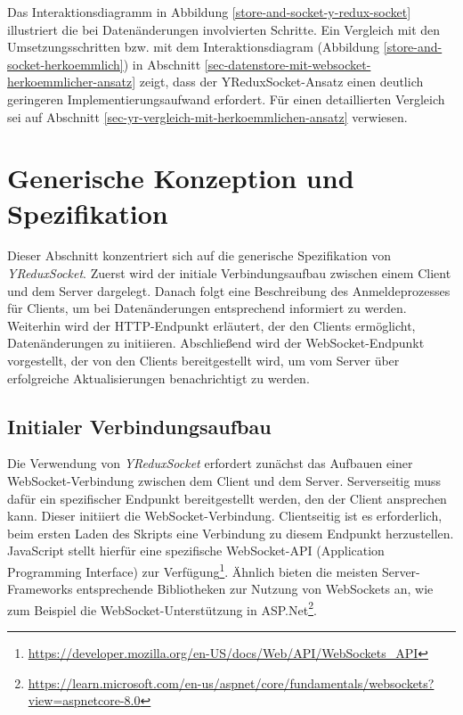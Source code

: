 \documentclass[12pt]{book}          %
\begin{document}
Das Interaktionsdiagramm in Abbildung \ref{store-and-socket-y-redux-socket} illustriert die bei Datenänderungen involvierten Schritte. Ein Vergleich mit den Umsetzungsschritten bzw. mit dem Interaktionsdiagram (Abbildung \ref{store-and-socket-herkoemmlich}) in Abschnitt \ref{sec-datenstore-mit-websocket-herkoemmlicher-ansatz} zeigt, dass der YReduxSocket-Ansatz einen deutlich geringeren Implementierungsaufwand erfordert. Für einen detaillierten Vergleich sei auf Abschnitt \ref{sec-yr-vergleich-mit-herkoemmlichen-ansatz} verwiesen.

\section{Generische Konzeption und Spezifikation}
\label{sec-generische-konzeption-und-spezifikation}

Dieser Abschnitt konzentriert sich auf die generische Spezifikation von \textit{YReduxSocket}. Zuerst wird der initiale Verbindungsaufbau zwischen einem Client und dem Server dargelegt. Danach folgt eine Beschreibung des Anmeldeprozesses für Clients, um bei Datenänderungen entsprechend informiert zu werden. Weiterhin wird der HTTP-Endpunkt erläutert, der den Clients ermöglicht, Datenänderungen zu initiieren. Abschließend wird der WebSocket-Endpunkt vorgestellt, der von den Clients bereitgestellt wird, um vom Server über erfolgreiche Aktualisierungen benachrichtigt zu werden.

\subsection{Initialer Verbindungsaufbau}
\label{subsec-initialer-verbindungsaufbau}

Die Verwendung von \textit{YReduxSocket} erfordert zunächst das Aufbauen einer WebSocket-Verbindung zwischen dem Client und dem Server. Serverseitig muss dafür ein spezifischer Endpunkt bereitgestellt werden, den der Client ansprechen kann. Dieser initiiert die WebSocket-Verbindung. Clientseitig ist es erforderlich, beim ersten Laden des Skripts eine Verbindung zu diesem Endpunkt herzustellen. JavaScript stellt hierfür eine spezifische WebSocket-API (Application Programming Interface) zur Verfügung\footnote{\url{https://developer.mozilla.org/en-US/docs/Web/API/WebSockets\_API}}. Ähnlich bieten die meisten Server-Frameworks entsprechende Bibliotheken zur Nutzung von WebSockets an, wie zum Beispiel die WebSocket-Unterstützung in ASP.Net\footnote{\url{https://learn.microsoft.com/en-us/aspnet/core/fundamentals/websockets?view=aspnetcore-8.0}}.
\end{document}
